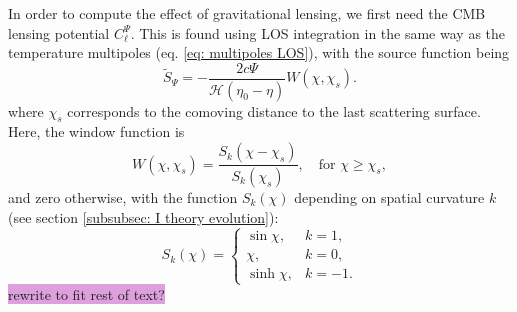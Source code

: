 \documentclass{aa}
\numberwithin{equation}{section}
\numberwithin{table}{section}
\numberwithin{figure}{section}
\begin{document}
In order to compute the effect of gravitational lensing, we first need the CMB lensing potential $C_\ell^\Psi$. This is found using LOS integration in the same way as the temperature multipoles (eq. \eqref{eq: multipoles LOS}), with the source function being
\begin{equation}
\tilde{S}_\Psi = -\frac{2c\Psi}{\mathcal{H}(\eta_0 - \eta)} W(\chi, \chi_s).
\end{equation}
where $\chi_s$ corresponds to the comoving distance to the last scattering surface. Here, the window function is
\begin{equation}
W(\chi, \chi_s) = \frac{S_k(\chi - \chi_s)}{S_k(\chi_s)}, \quad \text{for } \chi \geq \chi_s,
\end{equation}
and zero otherwise, with 
the function $S_k(\chi)$ depending on spatial curvature $k$ (see section \ref{subsubsec: I theory evolution}):
\begin{equation}
  S_k(\chi) = 
  \begin{cases}
  \sin\chi, & k = 1 , \\
\chi, & k = 0, \\
\sinh\chi, & k = -1.
\end{cases}
\end{equation}
\colorbox{Plum}{rewrite to fit rest of text?}
\end{document}
